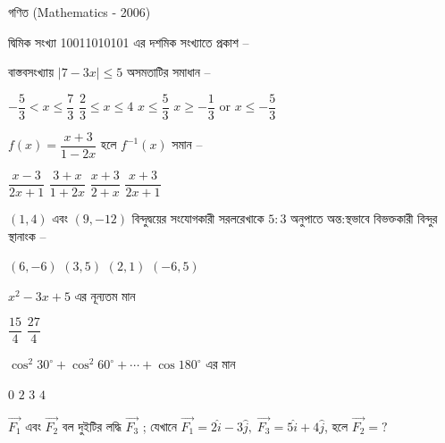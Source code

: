 \documentclass[addpoints]{exam}
\begin{document}
\begin{LARGE}
\begin{center}
গণিত (Mathematics - 2006)
\end{center}
\end{LARGE}
\begin{questions}

\question দ্বিমিক সংখ্যা 10011010101 এর দশমিক সংখ্যাতে  প্রকাশ  –

\begin{oneparchoices}
\end{oneparchoices}

\question বাস্তবসংখ্যায় $ |7-3x|\le 5 $ অসমতাটির সমাধান – 

\begin{oneparchoices}
\choice $ -\dfrac{5}{3}<x\le \dfrac{7}{3} $
\choice $ \dfrac{2}{3}\le x \le 4 $
\choice $ x\le \dfrac{5}{3}$
\choice $x\ge -\dfrac{1}{3}$ or $x\le  -\dfrac{5}{3} $
\end{oneparchoices}

\question  $ f(x) = \dfrac{x+3}{1-2x} $ হলে $  f^{-1}(x) $ সমান –

\begin{oneparchoices}
\choice $ \dfrac{x-3}{2x+1}$
\choice $ \dfrac{3+x}{1+2x}$
\choice $ \dfrac{x+3}{2+x}$
\choice  $ \dfrac{x+3}{2x+1}$
\end{oneparchoices}

\question  $ (1,4) $ এবং $ (9,-12) $ বিন্দুদ্বয়ের সংযোগকারী সরলরেখাকে $ 5:3 $ অনুপাতে অন্ত:স্থভাবে বিভক্তকারী বিন্দুর স্থানাংক –

\begin{oneparchoices}
\choice $ (6,-6) $
\choice $ (3,5) $
\choice $ (2, 1) $
\choice $ (-6,5) $
\end{oneparchoices}

\question $ x^{2}-3x+5 $  এর নূন্যতম মান

\begin{oneparchoices}
\choice $ \dfrac{15}{4} $
\choice $ \dfrac{27}{4} $
\end{oneparchoices}

\question $ \cos^{2} 30^{\circ} +\cos^{2} 60^{\circ} + \cdots + \cos 180^{\circ}$ এর মান

\begin{oneparchoices}
\choice $ 0 $
\choice $ 2 $
\choice $ 3 $
\choice $ 4 $
\end{oneparchoices}

 \question $ \vec{F_{1}}  $ এবং $ \vec{F_{2}}  $  বল দুইটির লদ্ধি $ \vec{F_{3}}  $ ; যেখানে $ \vec{F_{1}} = 2\hat{i}-3\hat{j},\;  \vec{F_{3}}= 5\hat{i}+4\hat{j}  $,  হলে $ \vec{F_{2}} =? $


\end{questions}
\end{document}
